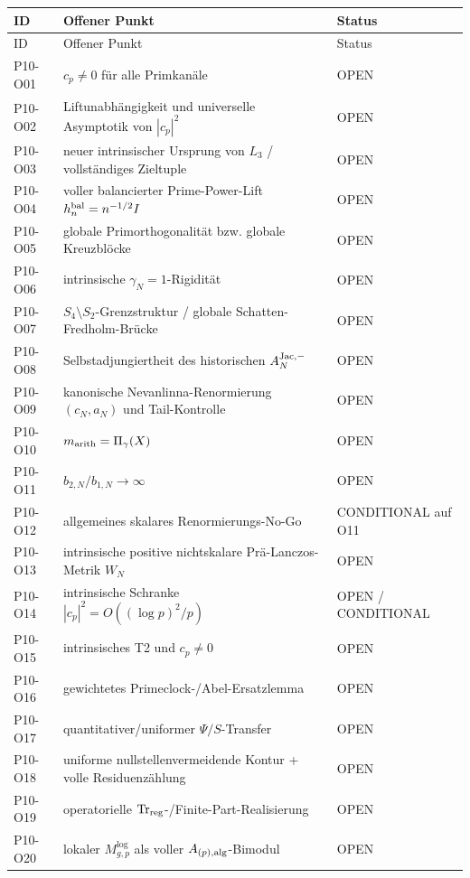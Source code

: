 \documentclass[11pt,a4paper]{amsart}
\begin{document}
\small
\begin{longtable}{>{\raggedright\arraybackslash}p{}
                  >{\raggedright\arraybackslash}p{}
                  >{\raggedright\arraybackslash}p{}}
\toprule
ID & Offener Punkt & Status\\
\midrule
\endfirsthead
\toprule
ID & Offener Punkt & Status\\
\midrule
\endhead
P10-O01 & $c_p\ne0$ für alle Primkanäle & OPEN\\
P10-O02 & Liftunabhängigkeit und universelle Asymptotik von $|c_p|^2$ & OPEN\\
P10-O03 & neuer intrinsischer Ursprung von $L_3$ / vollständiges Zieltuple & OPEN\\
P10-O04 & voller balancierter Prime-Power-Lift $h_n^{\rm bal}=n^{-1/2}I$ & OPEN\\
P10-O05 & globale Primorthogonalität bzw. globale Kreuzblöcke & OPEN\\
P10-O06 & intrinsische $\gamma_N=1$-Rigidität & OPEN\\
P10-O07 & $S_4\setminus S_2$-Grenzstruktur / globale Schatten-Fredholm-Brücke & OPEN\\
P10-O08 & Selbstadjungiertheit des historischen $A_N^{\rm Jac,-}$ & OPEN\\
P10-O09 & kanonische Nevanlinna-Renormierung $(c_N,a_N)$ und Tail-Kontrolle & OPEN\\
P10-O10 & $m_{\rm arith}=\Pi_\gamma(X)$ & OPEN\\
P10-O11 & $b_{2,N}/b_{1,N}\to\infty$ & OPEN\\
P10-O12 & allgemeines skalares Renormierungs-No-Go & CONDITIONAL auf O11\\
P10-O13 & intrinsische positive nichtskalare Prä-Lanczos-Metrik $W_N$ & OPEN\\
P10-O14 & intrinsische Schranke $|c_p|^2=O((\log p)^2/p)$ & OPEN / CONDITIONAL\\
P10-O15 & intrinsisches T2 und $c_p\ne0$ & OPEN\\
P10-O16 & gewichtetes Primeclock-/Abel-Ersatzlemma & OPEN\\
P10-O17 & quantitativer/uniformer $\Psi/S$-Transfer & OPEN\\
P10-O18 & uniforme nullstellenvermeidende Kontur + volle Residuenzählung & OPEN\\
P10-O19 & operatorielle $\operatorname{Tr}_{\rm reg}$-/Finite-Part-Realisierung & OPEN\\
P10-O20 & lokaler $M_{g,p}^{\log}$ als voller $A_{(p),\rm alg}$-Bimodul & OPEN\\

\end{longtable}
\end{document}
